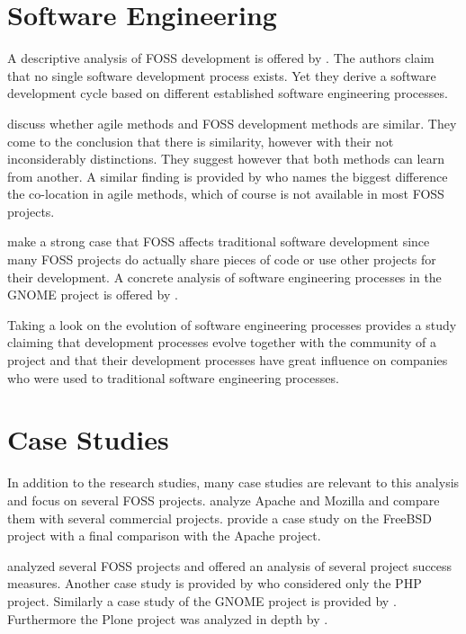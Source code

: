 
\section{Software Engineering} %

A descriptive analysis of \ac{FOSS} development is offered by
\textcite{Roets2007}. The authors claim that no single software development
process exists. Yet they derive a software development cycle based on different
established software engineering processes.

\textcite{Warsta2003} discuss whether agile methods and \ac{FOSS} development
methods are similar. They come to the conclusion that there is similarity,
however with their not inconsiderably distinctions. They suggest however that
both methods can learn from another. A similar finding is provided by
\textcite{Koch2004} who names the biggest difference the co-location in agile
methods, which of course is not available in most \ac{FOSS} projects.

\textcite{Spinellis2004} make a strong case that \ac{FOSS} affects traditional
software development since many \ac{FOSS} projects do actually share pieces of
code or use other projects for their development. A concrete analysis of
software engineering processes in the GNOME project is offered by
\textcite{German2003}.

Taking a look on the evolution of software engineering processes
\textcite{Scacchi2006} provides a study claiming that development processes
evolve together with the community of a project and that their development
processes have great influence on companies who were used to traditional
software engineering processes.


\section{Case Studies} %

In addition to the research studies, many case studies are relevant to this
analysis and focus on several \ac{FOSS} projects. \textcite{Mockus2002} analyze
Apache and Mozilla and compare them with several commercial projects.
\textcite{Dinh-Trong2004} provide a case study on the FreeBSD project with a
final comparison with the Apache project.

\textcite{crowston2004} analyzed several \ac{FOSS} projects and offered an
analysis of several project success measures. Another case study is provided by
\textcite{Magnusson2010} who considered only the PHP project. Similarly a case
study of the GNOME project is provided by \textcite{Koch2002}. Furthermore the
Plone project was analyzed in depth by \textcite{Aspeli2005}.


